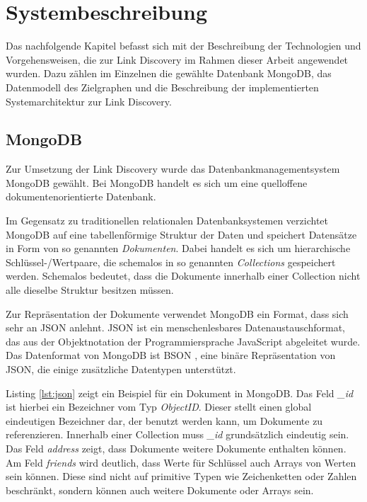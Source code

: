\chapter{Systembeschreibung}
\label{system}

Das nachfolgende Kapitel befasst sich mit der Beschreibung der Technologien und Vorgehensweisen, die zur Link Discovery im Rahmen dieser Arbeit angewendet wurden. Dazu zählen im Einzelnen die gewählte Datenbank MongoDB, das Datenmodell des Zielgraphen und die Beschreibung der implementierten Systemarchitektur zur Link Discovery.

\section{MongoDB}
\label{mongo}

Zur Umsetzung der Link Discovery wurde das Datenbankmanagementsystem MongoDB \cite{mo2013} gewählt. Bei MongoDB handelt es sich um eine quelloffene dokumentenorientierte Datenbank.

Im Gegensatz zu traditionellen relationalen Datenbanksystemen verzichtet MongoDB auf eine tabellenförmige Struktur der Daten und speichert Datensätze in Form von so genannten \emph{Dokumenten}. Dabei handelt es sich um hierarchische Schlüssel-/Wertpaare, die schemalos in so genannten \emph{Collections} gespeichert werden. Schemalos bedeutet, dass die Dokumente innerhalb einer Collection nicht alle dieselbe Struktur besitzen müssen.

Zur Repräsentation der Dokumente verwendet MongoDB ein Format, dass sich sehr an JSON \cite{json2006} anlehnt. JSON ist ein menschenlesbares Datenaustauschformat, das aus der Objektnotation der Programmiersprache JavaScript abgeleitet wurde. Das Datenformat von MongoDB ist BSON \cite{bson2013}, eine binäre Repräsentation von JSON, die einige zusätzliche Datentypen unterstützt. 

Listing \ref{lst:json} zeigt ein Beispiel für ein Dokument in MongoDB. Das Feld \emph{\_id} ist hierbei ein  Bezeichner vom Typ \emph{ObjectID}. Dieser stellt einen global eindeutigen Bezeichner dar, der benutzt werden kann, um Dokumente zu referenzieren. Innerhalb einer Collection muss \emph{\_id} grundsätzlich eindeutig sein. Das Feld \emph{address} zeigt, dass Dokumente weitere Dokumente enthalten können. Am Feld \emph{friends} wird deutlich, dass Werte für Schlüssel auch Arrays von Werten sein können. Diese sind nicht auf primitive Typen wie Zeichenketten oder Zahlen beschränkt, sondern können auch weitere Dokumente oder Arrays sein.

